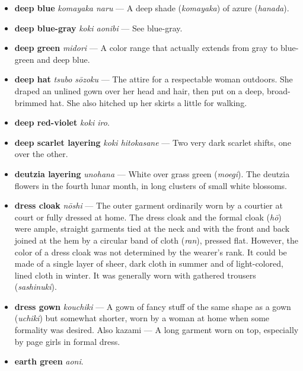 \documentclass{article}
\begin{document}
\begin{multicols}{3}
\begin{footnotesize}
\begin{itemize}[
			label=,
			leftmargin=0em,
			rightmargin=-1.5em,
			itemindent=-2em,
			nosep,
		]
		\item \textbf{deep blue} \textit{komayaka naru} --- A deep shade (\textit{komayaka}) of azure (\textit{hanada}).

		\item \textbf{deep blue-gray} \textit{koki aonibi} --- See blue-gray.

		\item \textbf{deep green} \textit{midori} --- A color range that actually extends from gray to blue-green and deep blue.

		\item \textbf{deep hat} \textit{tsubo sōzoku} --- The attire for a respectable woman outdoors. She draped an unlined gown over her head and hair, then put on a deep, broad-brimmed hat. She also hitched up her skirts a little for walking.

		\item \textbf{deep red-violet} \textit{koki iro}.

		\item \textbf{deep scarlet layering} \textit{koki hitokasane} --- Two very dark scarlet shifts, one over the other.

		\item \textbf{deutzia layering} \textit{unohana} --- White over grass green (\textit{moegi}). The deutzia flowers in the fourth lunar month, in long clusters of small white blossoms.

		\item \textbf{dress cloak} \textit{nōshi} --- The outer garment ordinarily worn by a courtier at court or fully dressed at home. The dress cloak and the formal cloak (\textit{hō}) were ample, straight garments tied at the neck and with the front and back joined at the hem by a circular band of cloth (\textit{ran}), pressed flat. However, the color of a dress cloak was not determined by the wearer's rank. It could be made of a single layer of sheer, dark cloth in summer and of light-colored, lined cloth in winter. It was generally worn with gathered trousers (\textit{sashinuki}).

		\item \textbf{dress gown} \textit{kouchiki} --- A gown of fancy stuff of the same shape as a gown (\textit{uchiki}) but somewhat shorter, worn by a woman at home when some formality was desired. Also kazami --- A long garment worn on top, especially by page girls in formal dress.

		\item \textbf{earth green} \textit{aoni}.


\end{itemize}
\end{footnotesize}
\end{multicols}
\end{document}
